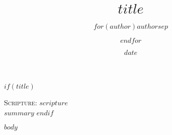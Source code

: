 \documentclass[Letter, 12pt]{report}
\title{$title$}
\author{$for(author)$$author$$sep$ \and $endfor$}
\date{$date$}
\begin{document}
$if(title)$
\maketitle
\textsc{Scripture}: $scripture$ \\
$summary$
$endif$ 

\pagebreak

$body$
\end{document}
